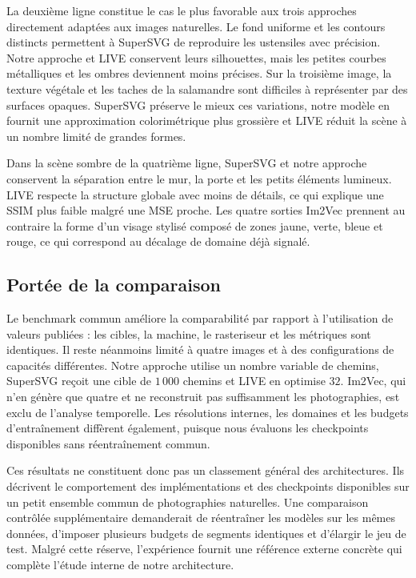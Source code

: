 \documentclass[12pt, a4paper, oneside]{report}
\begin{document}
La deuxième ligne constitue le cas le plus favorable aux trois approches directement adaptées aux images naturelles. Le fond uniforme et les contours distincts permettent à SuperSVG de reproduire les ustensiles avec précision. Notre approche et LIVE conservent leurs silhouettes, mais les petites courbes métalliques et les ombres deviennent moins précises. Sur la troisième image, la texture végétale et les taches de la salamandre sont difficiles à représenter par des surfaces opaques. SuperSVG préserve le mieux ces variations, notre modèle en fournit une approximation colorimétrique plus grossière et LIVE réduit la scène à un nombre limité de grandes formes.

Dans la scène sombre de la quatrième ligne, SuperSVG et notre approche conservent la séparation entre le mur, la porte et les petits éléments lumineux. LIVE respecte la structure globale avec moins de détails, ce qui explique une SSIM plus faible malgré une MSE proche. Les quatre sorties Im2Vec prennent au contraire la forme d'un visage stylisé composé de zones jaune, verte, bleue et rouge, ce qui correspond au décalage de domaine déjà signalé.

\subsection{Portée de la comparaison}

Le benchmark commun améliore la comparabilité par rapport à l'utilisation de valeurs publiées : les cibles, la machine, le rasteriseur et les métriques sont identiques. Il reste néanmoins limité à quatre images et à des configurations de capacités différentes. Notre approche utilise un nombre variable de chemins, SuperSVG reçoit une cible de $1\,000$ chemins et LIVE en optimise $32$. Im2Vec, qui n'en génère que quatre et ne reconstruit pas suffisamment les photographies, est exclu de l'analyse temporelle. Les résolutions internes, les domaines et les budgets d'entraînement diffèrent également, puisque nous évaluons les checkpoints disponibles sans réentraînement commun.

Ces résultats ne constituent donc pas un classement général des architectures. Ils décrivent le comportement des implémentations et des checkpoints disponibles sur un petit ensemble commun de photographies naturelles. Une comparaison contrôlée supplémentaire demanderait de réentraîner les modèles sur les mêmes données, d'imposer plusieurs budgets de segments identiques et d'élargir le jeu de test. Malgré cette réserve, l'expérience fournit une référence externe concrète qui complète l'étude interne de notre architecture.
\end{document}
